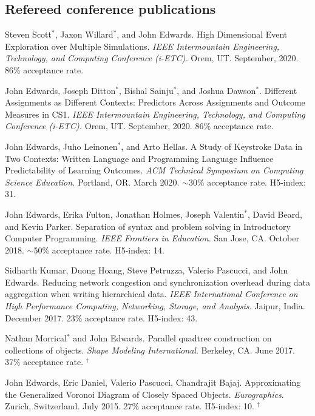 \documentclass[margin,line]{res}
\newcommand{\pubunder}[1]{#1}
\begin{document}
\begin{resume}
\section{\sc Refereed conference publications}

Steven Scott$^*$, Jaxon Willard$^*$, and John Edwards. High Dimensional Event Exploration over Multiple Simulations. \textit{IEEE Intermountain Engineering, Technology, and Computing Conference (i-ETC).} Orem, UT. September, 2020. 86\% acceptance rate.

John Edwards, Joseph Ditton$^*$, Bishal Sainju$^*$, and Joshua Dawson$^*$. Different Assignments as Different Contexts: Predictors Across Assignments and Outcome Measures in CS1. \textit{IEEE Intermountain Engineering, Technology, and Computing Conference (i-ETC).} Orem, UT. September, 2020. 86\% acceptance rate.

John Edwards, Juho Leinonen$^*$, and Arto Hellas. A Study of Keystroke Data in Two Contexts: Written Language and Programming Language Influence Predictability of Learning Outcomes.  \textit{ACM Technical Symposium on Computing Science Education.} Portland, OR. March 2020.  $\sim$30\% acceptance rate. H5-index: 31.

John Edwards, Erika Fulton, Jonathan Holmes, Joseph Valentin$^*$, David Beard, and Kevin Parker. Separation of syntax and problem solving in Introductory Computer Programming. \textit{IEEE Frontiers in Education.} San Jose, CA. October 2018.  $\sim$50\% acceptance rate. H5-index: 14.

Sidharth Kumar, Duong Hoang, Steve Petruzza, Valerio Pascucci, and \pubunder{John Edwards}. Reducing network congestion and synchronization overhead during data aggregation when writing hierarchical data. \textit{IEEE International Conference on High Performance Computing, Networking, Storage, and Analysis.} Jaipur, India. December 2017. 23\% acceptance rate. H5-index: 43.

Nathan Morrical$^*$ and \pubunder{John Edwards}. Parallel quadtree construction on collections of objects. \textit{Shape Modeling International}. Berkeley, CA. June 2017. 37\% acceptance rate.
$^\dagger$

\pubunder{John Edwards}, Eric Daniel, Valerio Pascucci, Chandrajit Bajaj. Approximating the Generalized Voronoi Diagram of Closely Spaced Objects. \textit{Eurographics}. Zurich, Switzerland. July 2015. 27\% acceptance rate. H5-index: 10.
$^\dagger$


\end{resume}
\end{document}
